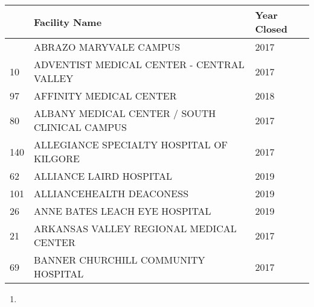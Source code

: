 \documentclass[
  letterpaper,
  DIV=11,
  numbers=noendperiod]{scrartcl}
\providecommand{\tightlist}{%
  \setlength{\itemsep}{0pt}\setlength{\parskip}{0pt}}\usepackage{longtable,booktabs,array}
\begin{document}
\begin{longtable}[]{@{}lll@{}}
\toprule\noalign{}
& Facility Name & Year Closed \\
\midrule\noalign{}
\endhead
\bottomrule\noalign{}
\endlastfoot
4 & ABRAZO MARYVALE CAMPUS & 2017 \\
10 & ADVENTIST MEDICAL CENTER - CENTRAL VALLEY & 2017 \\
97 & AFFINITY MEDICAL CENTER & 2018 \\
80 & ALBANY MEDICAL CENTER / SOUTH CLINICAL CAMPUS & 2017 \\
140 & ALLEGIANCE SPECIALTY HOSPITAL OF KILGORE & 2017 \\
62 & ALLIANCE LAIRD HOSPITAL & 2019 \\
101 & ALLIANCEHEALTH DEACONESS & 2019 \\
26 & ANNE BATES LEACH EYE HOSPITAL & 2019 \\
21 & ARKANSAS VALLEY REGIONAL MEDICAL CENTER & 2017 \\
69 & BANNER CHURCHILL COMMUNITY HOSPITAL & 2017 \\
\end{longtable}

\begin{enumerate}
\def\labelenumi{\arabic{enumi}.}
\setcounter{enumi}{2}
\tightlist
\item
\end{enumerate}
\end{document}
